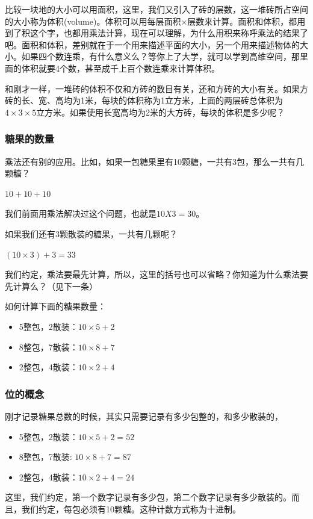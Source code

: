 比较一块地的大小可以用面积，这里，我们又引入了砖的层数，这一堆砖所占空间的大小称为体积(volume)。体积可以用每层面积$\times$层数来计算。面积和体积，都用到了积这个字，也都用乘法计算，现在可以理解，为什么用积来称呼乘法的结果了吧。面积和体积，差别就在于一个用来描述平面的大小，另一个用来描述物体的大小。如果四个数连乘，有什么意义么？等你上了大学，就可以学到高维空间，那里面的体积就要4个数，甚至成千上百个数连乘来计算体积。

和刚才一样，一堆砖的体积不仅和方砖的数目有关，还和方砖的大小有关。如果方砖的长、宽、高均为1米，每块的体积称为1立方米，上面的两层砖总体积为$4\times3\times5$立方米。如果使用长宽高均为2米的大方砖，每块的体积是多少呢？

\subsubsection{糖果的数量}
    
乘法还有别的应用。比如，如果一包糖果里有10颗糖，一共有3包，那么一共有几颗糖？

    $10 + 10 + 10$
  
我们前面用乘法解决过这个问题，也就是$10X3=30$。

如果我们还有3颗散装的糖果，一共有几颗呢？

    $(10\times3) + 3 = 33$

 我们约定，乘法要最先计算，所以，这里的括号也可以省略？你知道为什么乘法要先计算么？（见下一条）

 如何计算下面的糖果数量：
 \begin{itemize}
    \item 5整包，2散装：$10\times5+2$
    \item 8整包，7散装：$10\times8+7$
    \item 2整包，4散装：$10\times2+4$
 \end{itemize}
 

\subsubsection{位的概念}
刚才记录糖果总数的时候，其实只需要记录有多少包整的，和多少散装的，
\begin{itemize}
 \item 5整包，2散装：$10\times5+2 = 52$
 \item 8整包，7散装: $10\times8+7 = 87$
 \item 2整包，4散装：$10\times2+4 = 24$
\end{itemize}

这里，我们约定，第一个数字记录有多少包，第二个数字记录有多少散装的。而且，我们约定，每包必须有10颗糖。这种计数方式称为十进制。

